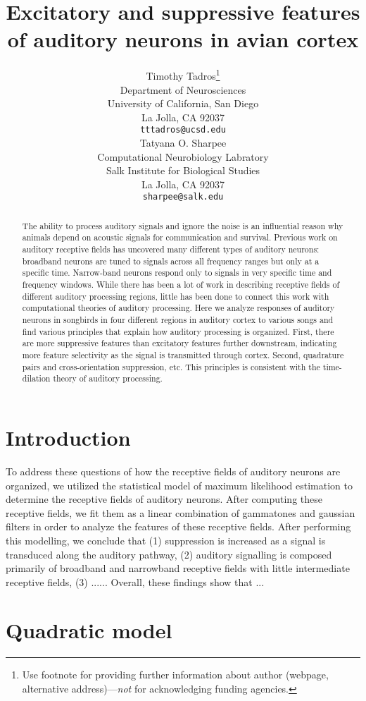\documentclass{article}
\title{Excitatory and suppressive features of auditory neurons in avian cortex}
\author{
  Timothy Tadros\thanks{Use footnote for providing further
    information about author (webpage, alternative
    address)---\emph{not} for acknowledging funding agencies.} \\
  Department of Neurosciences\\
  University of California, San Diego\\
  La Jolla, CA 92037 \\
  \texttt{tttadros@ucsd.edu} \\
  \And
  Tatyana O. Sharpee\\
  Computational Neurobiology Labratory\\
  Salk Institute for Biological Studies\\
  La Jolla, CA 92037\\
  \texttt{sharpee@salk.edu}\\
}
\begin{document}

\maketitle

\begin{abstract}
  The ability to process auditory signals and ignore the noise is an influential reason why animals depend on acoustic signals for communication and survival. Previous work on auditory receptive fields has uncovered many different types of auditory neurons: broadband neurons are tuned to signals across all frequency ranges but only at a specific time. Narrow-band neurons respond only to signals in very specific time and frequency windows. While there has been a lot of work in describing receptive fields of different auditory processing regions, little has been done to connect this work with computational theories of auditory processing. Here we analyze responses of auditory neurons in songbirds in four different regions in auditory cortex to various songs and find various principles that explain how auditory processing is organized. First, there are more suppressive features than excitatory features further downstream, indicating more feature selectivity as the signal is transmitted through cortex. Second, quadrature pairs and cross-orientation suppression, etc. This principles is consistent with the time-dilation theory of auditory processing.
\end{abstract}

\section{Introduction}

To address these questions of how the receptive fields of auditory neurons are organized, we utilized the statistical model of maximum likelihood estimation to determine the receptive fields of auditory neurons. After computing these receptive fields, we fit them as a linear combination of gammatones and gaussian filters in order to analyze the features of these receptive fields. After performing this modelling, we conclude that (1) suppression is increased as a signal is transduced along the auditory pathway, (2) auditory signalling is composed primarily of broadband and narrowband receptive fields with little intermediate receptive fields, (3) ...... Overall, these findings show that ...
\section{Quadratic model}
\end{document}
